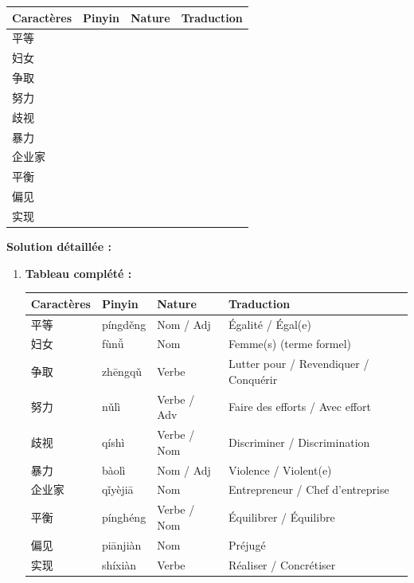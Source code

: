 \documentclass[11pt]{article}
\begin{document}
\begin{exoresolu}
\begin{center}
\begin{tabularx}{\linewidth}{|X|X|X|X|}
\hline
\rowcolor{popblueL} \textbf{Caractères} & \textbf{Pinyin} & \textbf{Nature} & \textbf{Traduction} \\ \hline
平等 &  &  &  \\ \hline
妇女 &  &  &  \\ \hline
争取 &  &  &  \\ \hline
努力 &  &  &  \\ \hline
歧视 &  &  &  \\ \hline
暴力 &  &  &  \\ \hline
企业家 &  &  &  \\ \hline
平衡 &  &  &  \\ \hline
偏见 &  &  &  \\ \hline
实现 &  &  &  \\ \hline
\end{tabularx}
\end{center}
\tcblower
\textbf{Solution détaillée :}
\begin{enumerate}
    \item \textbf{Tableau complété :}
\begin{center}
\begin{tabularx}{\linewidth}{|X|X|X|X|}
\hline
\rowcolor{popblueL} \textbf{Caractères} & \textbf{Pinyin} & \textbf{Nature} & \textbf{Traduction} \\ \hline
平等 & píngděng & Nom / Adj & Égalité / Égal(e) \\ \hline
妇女 & fùnǚ & Nom & Femme(s) (terme formel) \\ \hline
争取 & zhēngqǔ & Verbe & Lutter pour / Revendiquer / Conquérir \\ \hline
努力 & nǔlì & Verbe / Adv & Faire des efforts / Avec effort \\ \hline
歧视 & qíshì & Verbe / Nom & Discriminer / Discrimination \\ \hline
暴力 & bàolì & Nom / Adj & Violence / Violent(e) \\ \hline
企业家 & qǐyèjiā & Nom & Entrepreneur / Chef d'entreprise \\ \hline
平衡 & pínghéng & Verbe / Nom & Équilibrer / Équilibre \\ \hline
偏见 & piānjiàn & Nom & Préjugé \\ \hline
实现 & shíxiàn & Verbe & Réaliser / Concrétiser \\ \hline
\end{tabularx}
\end{center}

\end{enumerate}
\end{exoresolu}
\end{document}
